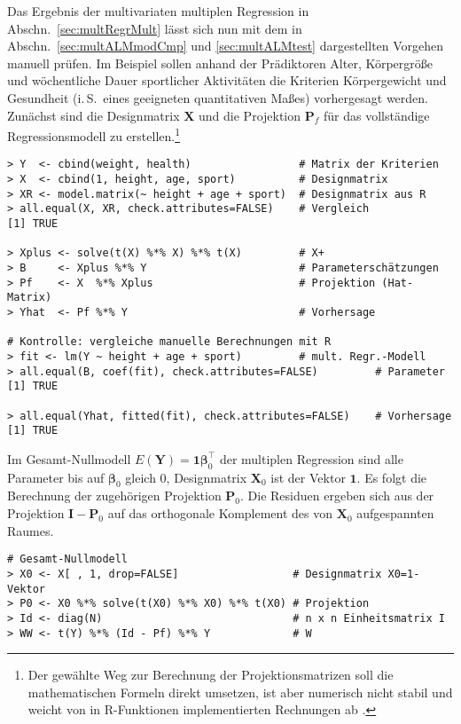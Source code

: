 Das Ergebnis der multivariaten multiplen Regression in Abschn.\ \ref{sec:multRegrMult} lässt sich nun mit dem in Abschn.\ \ref{sec:multALMmodCmp} und \ref{sec:multALMtest} dargestellten Vorgehen manuell prüfen. Im Beispiel sollen anhand der Prädiktoren Alter, Körpergröße und wöchentliche Dauer sportlicher Aktivitäten die Kriterien Körpergewicht und Gesundheit (i.\,S.\ eines geeigneten quantitativen Maßes) vorhergesagt werden. Zunächst sind die Designmatrix $\bm{X}$ und die Projektion $\bm{P}_{f}$ für das vollständige Regressionsmodell zu erstellen.\footnote{Der gewählte Weg zur Berechnung der Projektionsmatrizen soll die mathematischen Formeln direkt umsetzen, ist aber numerisch nicht stabil und weicht von in R-Funktionen implementierten Rechnungen ab \cite{Bates2004}.}
\begin{lstlisting}
> Y  <- cbind(weight, health)                 # Matrix der Kriterien
> X  <- cbind(1, height, age, sport)          # Designmatrix
> XR <- model.matrix(~ height + age + sport)  # Designmatrix aus R
> all.equal(X, XR, check.attributes=FALSE)    # Vergleich
[1] TRUE

> Xplus <- solve(t(X) %*% X) %*% t(X)         # X+
> B     <- Xplus %*% Y                        # Parameterschätzungen
> Pf    <- X  %*% Xplus                       # Projektion (Hat-Matrix)
> Yhat  <- Pf %*% Y                           # Vorhersage

# Kontrolle: vergleiche manuelle Berechnungen mit R
> fit <- lm(Y ~ height + age + sport)         # mult. Regr.-Modell
> all.equal(B, coef(fit), check.attributes=FALSE)         # Parameter
[1] TRUE

> all.equal(Yhat, fitted(fit), check.attributes=FALSE)    # Vorhersage
[1] TRUE
\end{lstlisting}

Im Gesamt-Nullmodell $E(\bm{Y}) = \bm{1} \bm{\beta}_{0}^{\top}$ der multiplen Regression sind alle Parameter bis auf $\bm{\beta}_{0}$ gleich $0$, Designmatrix $\bm{X}_{0}$ ist der Vektor $\bm{1}$. Es folgt die Berechnung der zugehörigen Projektion $\bm{P}_{0}$. Die Residuen ergeben sich aus der Projektion $\bm{I} - \bm{P}_{0}$ auf das orthogonale Komplement des von $\bm{X}_{0}$ aufgespannten Raumes.
\begin{lstlisting}
# Gesamt-Nullmodell
> X0 <- X[ , 1, drop=FALSE]                  # Designmatrix X0=1-Vektor
> P0 <- X0 %*% solve(t(X0) %*% X0) %*% t(X0) # Projektion
> Id <- diag(N)                              # n x n Einheitsmatrix I
> WW <- t(Y) %*% (Id - Pf) %*% Y             # W
\end{lstlisting}

